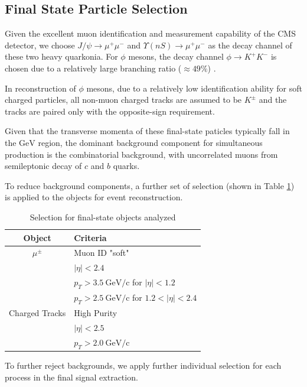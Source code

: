 \documentclass[10pt,twocolumn]{article}
\newcommand*{\GeVc}{~\text{GeV/c}}
\begin{document}
\subsection{Final State Particle Selection}

Given the excellent muon identification and measurement capability of the CMS detector,  we choose $J/\psi\to\mu^+\mu^-$ and $\Upsilon(nS)\to\mu^+\mu^-$ as the decay channel of these two heavy quarkonia. For $\phi$ mesons, the decay channel $\phi\to K^+K^-$ is chosen due to a relatively large branching ratio ($\approx 49\%$) \cite{PDG2020}.

In reconstruction of $\phi$ mesons, due to a relatively low identification ability for soft charged particles, all non-muon charged tracks are assumed to be $K^\pm $ and the tracks are paired only with the opposite-sign requirement.

Given that the transverse momenta of these final-state paticles typically fall in the $\text{GeV}$ region, the dominant background component for simultaneous production is the combinatorial background, with uncorrelated muons from semileptonic decay of $c$ and $b$ quarks.

To reduce background components, a further set of selection (shown in Table \ref{tab:mu_K_cuts}) is applied to the objects for event reconstruction.

\begin{table}[H]
    \centering
    \caption{Selection for final-state objects analyzed}
    \begin{tabular}{cl}
    \toprule
    \textbf{Object} & \textbf{Criteria} \\
    \midrule
    $\mu^\pm $ & Muon ID "soft" \\
              & $|\eta| < 2.4$ \\
              & $p_T > 3.5\GeVc$ for $|\eta| < 1.2$ \\
              & $p_T > 2.5\GeVc$ for $1.2 < |\eta| < 2.4$ \\
              \midrule
    Charged Tracks & High Purity \\
              & $|\eta|<2.5$ \\
              & $p_T > 2.0 \GeVc$ \\
    \bottomrule
    \end{tabular}
    \label{tab:mu_K_cuts}
\end{table}

To further reject backgrounds, we apply further individual selection for each process in the final signal extraction.
\end{document}
